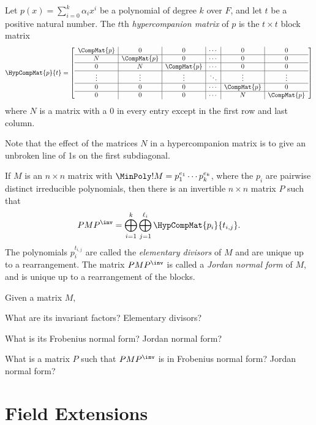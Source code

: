 \documentclass{memoir}
\begin{document}
\begin{dfn}
Let $p(x) = \sum_{i=0}^{k} \alpha_i x^i$ be a polynomial of degree $k$ over $F$, and let $t$ be a positive natural number. The $t$th \emph{hypercompanion matrix} of $p$ is the $t \times t$ block matrix \[ \HypCompMat{p}{t} = \left[ \begin{array}{c|c|c|c|c|c} \CompMat{p} & 0 & 0 & \cdots & 0 & 0 \\ \hline N & \CompMat{p} & 0 & \cdots & 0 & 0 \\ \hline 0 & N & \CompMat{p} & \cdots & 0 & 0 \\ \hline \vdots & \vdots & \vdots & \ddots & \vdots & \vdots \\ \hline 0 & 0 & 0 & \cdots & \CompMat{p} & 0 \\ \hline 0 & 0 & 0 & \cdots & N & \CompMat{p} \end{array} \right] \] where $N$ is a matrix with a 0 in every entry except in the first row and last column.
\end{dfn}

Note that the effect of the matrices $N$ in a hypercompanion matrix is to give an unbroken line of 1s on the first subdiagonal.

\begin{prp}
If $M$ is an $n \times n$ matrix with $\MinPoly!{M} = p_1^{e_1} \cdots p_k^{e_k}$, where the $p_i$ are pairwise distinct irreducible polynomials, then there is an invertible $n \times n$ matrix $P$ such that \[ PMP^\inv = \bigoplus_{i=1}^k \bigoplus_{j=1}^{\ell_i} \HypCompMat{p_i}{t_{i,j}}. \] The polynomials $p_i^{t_{i,j}}$ are called the \emph{elementary divisors} of $M$ and are unique up to a rearrangement. The matrix $PMP^\inv$ is called a \emph{Jordan normal form} of $M$, and is unique up to a rearrangement of the blocks.
\end{prp}

Given a matrix $M$,
\begin{enumerate*}
\item What are its invariant factors? Elementary divisors?
\item What is its Frobenius normal form? Jordan normal form?
\item What is a matrix $P$ such that $PMP^\inv$ is in Frobenius normal form? Jordan normal form?
\end{enumerate*}

\section{Field Extensions}
\end{document}
